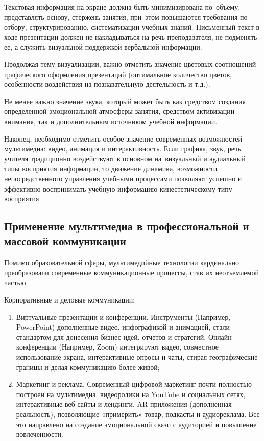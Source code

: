 \documentclass{ou}
\begin{document}
Текстовая информация на экране должна быть минимизирована по~объему, представлять основу, стержень занятия, при~этом повышаются требования по отбору, структурированию, систематизации учебных знаний. Письменный текст в ходе презентации должен не накладываться на речь преподавателя, не подменять ее, а служить визуальной поддержкой вербальной информации.

Продолжая тему визуализации, важно отметить значение цветовых соотношений графического оформления презентаций (оптимальное количество цветов, особенности воздействия на познавательную деятельность и т.д.).

Не менее важно значение звука, который может быть как средством создания определенной эмоциональной атмосферы занятия, средством активизации внимания, так и дополнительным источником учебной информации.

Наконец, необходимо отметить особое значение современных возможностей мультимедиа: видео, анимация и интерактивность. Если графика, звук, речь учителя традиционно воздействуют в основном на~визуальный и аудиальный типы восприятия информации, то движение динамика, возможности непосредственного управления учебными процессами позволяют успешно и эффективно воспринимать учебную информацию кинестетическому типу восприятия.
\subsection{Применение мультимедиа в профессиональной и массовой коммуникации}
Помимо образовательной сферы, мультимедийные технологии кардинально преобразовали современные коммуникационные процессы, став их неотъемлемой частью. 

Корпоративные и деловые коммуникации:
\begin{enumerate}[leftmargin=0em, itemindent=3.75em, nosep, label=\arabic*)]
\item Виртуальные презентации и конференции. Инструменты (Например, PowerPoint) дополненные видео, инфографикой и анимацией, стали стандартом для донесения бизнес-идей, отчетов и стратегий. Онлайн-конференции (Например, Zoom) интегрируют видео, совместное использование экрана, интерактивные опросы и чаты, стирая географические границы и делая коммуникацию более живой;
\item Маркетинг и реклама. Современный цифровой маркетинг почти полностью построен на мультимедиа: видеоролики на YouTube и социальных сетях, интерактивные веб-сайты и лендинги, AR-приложения (дополненная реальность), позволяющие «примерить» товар, подкасты и аудиореклама. Все это направлено на создание эмоциональной связи с аудиторией и повышение вовлеченности.
\end{enumerate}
\end{document}
